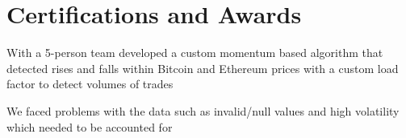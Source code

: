 \documentclass[]{resume-template}
\begin{document}
\begin{minipage}[t]{0.66\textwidth}


    \sectionsep{}






    \section{Certifications and Awards}\label{sec:certifications-and-awards}
    \begin{tightemize}
        \item With a  5-person team developed a custom momentum based algorithm that detected rises and falls within
        Bitcoin and Ethereum prices with a custom load factor to detect volumes of trades
        \item We faced problems with the data such as invalid/null values and high volatility which needed to be
        accounted for
    \end{tightemize}
    \sectionsep{}
    \sectionsep{}


\end{minipage}
\end{document}
